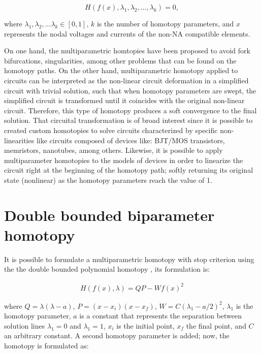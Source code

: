 \documentclass[conference,letterpaper,twocolumn]{IEEEtran}
\begin{document}
\begin{equation}
{H}({f}({x}),\lambda_1,\lambda_2,...,\lambda_k)=0,
\end{equation}

where $\lambda_1,\lambda_2,...\lambda_k\in[0,1]$, $k$ is the number of homotopy parameters, and $x$ represents the nodal voltages and currents of the non-NA compatible elements.

On one hand, the multiparametric homtopies \cite{homo_DWolfMulti} have been proposed to avoid fork bifurcations, singularities, among other problems that can be found on the homotopy paths. On the other hand, multiparametric homotopy applied to circuits can be interpreted as the non-linear circuit deformation in a simplified circuit with trivial solution, such that when homotopy parameters are swept, the simplified circuit is transformed until it coincides with the original non-linear circuit. Therefore, this type of homotopy produces a soft convergence to the final solution. That circuital transformation is of broad interest since it is possible to created custom homotopies to solve circuits characterized by specific non-linearities like circuits composed of devices like: BJT/MOS transistors, memristors, nanotubes, among others. Likewise, it is possible to apply multiparameter homotopies to the models of devices in order to linearize the circuit right at the beginning of the homotopy path; softly returning its original state (nonlinear) as the homotopy parameters reach the value of 1.

\section{Double bounded biparameter homotopy}
It is possible to formulate a multiparametric homotopy with stop criterion using the the double bounded polynomial homotopy \cite{xxx}, its formulation is:

\begin{equation}
{
\begin{array}{l}
{H}({f}({x}),\lambda )=QP - W {f}({x})^2
\end{array}}
\label{homotopiaP}
\end{equation}

where $Q=\lambda(\lambda-a)$,  $P=(x-x_i)(x-x_f)$, $W=C(\lambda_1-a/2)^2$, $\lambda_1$ is the homotopy parameter, $a$ is a constant that represents the separation between solution lines $\lambda_1=0$ and $\lambda_1=1$, $x_i$ is the initial point, $x_f$ the final point, and $C$ an arbitrary constant. A second homotopy parameter is added; now, the homotopy is formulated as:
\end{document}
